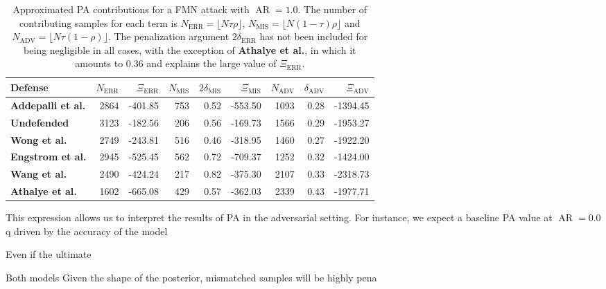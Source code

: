 \begin{table}[h]
    \centering
    \begin{tabular}{l|rr|rrr|rrr}
    Defense & $N_{\text{ERR}}$ & $\Xi_{\text{ERR}}$ & $N_{\text{MIS}}$ & $2 \delta_{\text{MIS}}$ & $\Xi_{\text{MIS}}$ & $N_{\text{ADV}}$ & $\delta_{\text{ADV}}$ & $\Xi_{\text{ADV}}$ \\
    \midrule
    {\color{tab:purple} \textbf{Addepalli et al.}} & 2864 & -401.85 & 753 & 0.52 & -553.50 & 1093 & 0.28 & -1394.45 \\
    {\color{tab:orange} \textbf{Undefended}} & 3123 & -182.56 & 206 & 0.56 & -169.73 & 1566 & 0.29 & -1953.27 \\
    {\color{tab:red} \textbf{Wong et al.}} & 2749 & -243.81 & 516 & 0.46 & -318.95 & 1460 & 0.27 & -1922.20 \\
    {\color{tab:blue} \textbf{Engstrom et al.}} & 2945 & -525.45 & 562 & 0.72 & -709.37 & 1252 & 0.32 & -1424.00 \\
    {\color{tab:brown} \textbf{Wang et al.}} & 2490 & -424.24 & 217 & 0.82 & -375.30 & 2107 & 0.33 & -2318.73 \\
    {\color{tab:green} \textbf{Athalye et al.}} & 1602 & -665.08 & 429 & 0.57 & -362.03 & 2339 & 0.43 & -1977.71 \\
    \bottomrule
    \end{tabular}
    \caption{
    Approximated PA contributions for a FMN attack with 
    $\operatorname{AR} = 1.0$. The number of contributing samples for each term is 
    $N_{\text{ERR}} = \lfloor N \tau \rho \rfloor$, $N_{\text{MIS}} = \lfloor N (1-\tau) \rho \rfloor$ and
    $N_{\text{ADV}} = \lfloor N \tau (1-\rho) \rfloor$. The penalization argument $2 \delta_{\text{ERR}}$ has not
    been included for being negligible in all cases, with the exception of {\color{tab:green} \textbf{Athalye et al.}}, in which 
    it amounts to $0.36$ and explains the large value of $\Xi_{\text{ERR}}$.
    }
    \label{tab:approx_pa_fmn_table}
\end{table}

This expression allows us to interpret the results of PA in the adversarial setting. For instance,
we expect a baseline PA value at $\operatorname{AR} = 0.0$q  driven by the accuracy of the model



Even if the ultimate 


Both models 
Given the shape of the posterior, mismatched samples will be
highly pena\\

